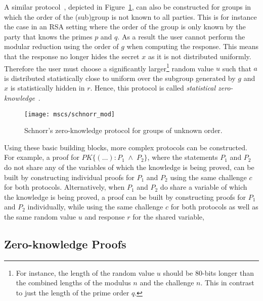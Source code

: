 A similar protocol~\cite[Section~3.5]{Camenisch2007}, depicted in Figure~\ref{msc:schnorr_mod},
can also be constructed for groups in which the order of the (sub)group is not
known to all parties. This is for instance the case in an RSA setting where the
order of the group is only known by the party that knows the primes $p$ and $q$.
As a result the user cannot perform the modular reduction using the order of $g$
when computing the response. This means that the response no longer hides the
secret $x$ as it is not distributed uniformly. Therefore the user must choose a
significantly larger\footnote{For instance, the length of the random value $u$
should be 80-bits longer than the combined lengths of the modulus $n$ and the
challenge $n$. This in contrast to just the length of the prime order $q$.}
random value $u$ such that $a$ is distributed statistically close to uniform
over the subgroup generated by $g$ and $x$ is statistically hidden in $r$.
Hence, this protocol is called \emph{statistical zero-knowledge}~\cite{Pointcheval2000}.

\begin{figure}[t]
  \centering
  \texttt{[image: mscs/schnorr\_mod]}
  \caption{Schnorr's zero-knowledge protocol for groups of unknown order.}
  \label{msc:schnorr_mod}
\end{figure}

Using these basic building blocks, more complex protocols can be constructed.
For example, a proof for $PK\{(\dots) : P_1 \;\land\; P_2 \}$, where the
statements $P_1$ and $P_2$ do not share any of the variables of which the
knowledge is being proved, can be built by constructing individual proofs for
$P_1$ and $P_2$ using the same challenge $c$ for both protocols. Alternatively,
when $P_1$ and $P_2$ do share a variable of which the knowledge is being proved,
a proof can be built by constructing proofs for $P_1$ and $P_2$ individually,
while using the same challenge $c$ for both protocols as well as the same random
value $u$ and response $r$ for the shared variable,

\subsection{Zero-knowledge Proofs}

